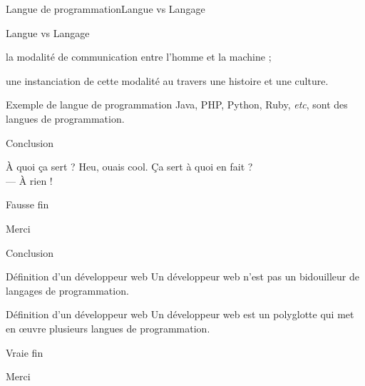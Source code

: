 \documentclass[12pt]{beamer}
\newcommand{\ofgfr}[1]{\og{}#1\fg{}}
\begin{document}
\begin{frame}{Langue de programmation}{Langue vs Langage}
\begin{block}{Langue vs Langage}
\begin{description}[<+->]
\item[Langage de programmation :] la \alert{modalité de communication} entre l'homme et la machine ;
\item[Langue de programmation :] une instanciation de cette modalité au travers une histoire et une culture.
\end{description}
\end{block}
\pause
\begin{exampleblock}{Exemple de langue de programmation}
Java, PHP, Python, Ruby, \emph{etc}, sont des \alert{langues de programmation}.
\end{exampleblock}
\end{frame}

\begin{frame}{Conclusion}
\begin{block}{À quoi ça sert ?}
\ofgfr{Heu, ouais cool. Ça sert à quoi en fait ?\\\pause --- À rien !}
\end{block}
\end{frame}

\begin{frame}{Fausse fin}
\begin{center}
\huge{Merci}
\end{center}
\end{frame}

\begin{frame}{Conclusion}
\pause
\begin{alertblock}{Définition d'un développeur web}
Un développeur web n'est pas un \alert{bidouilleur de langages de programmation}.
\end{alertblock}
\pause
\begin{block}{Définition d'un développeur web}
Un développeur web est un \alert{polyglotte} qui met en œuvre plusieurs \alert{langues de programmation}.
\end{block}
\end{frame}

\begin{frame}{Vraie fin}
\begin{center}
\Huge{Merci}
\end{center}
\end{frame}
\end{document}
